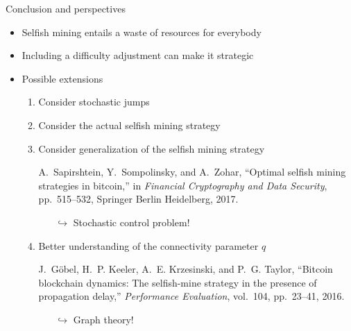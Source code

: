 \documentclass{beamer}
\begin{document}
\begin{frame}{Conclusion and perspectives}
\begin{itemize}
  \item Selfish mining entails a waste of resources for everybody
  \item Including a difficulty adjustment can make it strategic
  \item Possible extensions
  \begin{enumerate}
  \item Consider stochastic jumps
  \item Consider the actual selfish mining strategy
  \item Consider generalization of the selfish mining strategy
  \tiny 
  \begin{thebibliography}{1}

A.~Sapirshtein, Y.~Sompolinsky, and A.~Zohar, ``Optimal selfish mining
  strategies in bitcoin,'' in {\em Financial Cryptography and Data Security},
  pp.~515--532, Springer Berlin Heidelberg, 2017.

\end{thebibliography}
\begin{itemize}
  \item[$\hookrightarrow$] Stochastic control problem!
\end{itemize}
\item \small Better understanding of the connectivity parameter $q$
\tiny 
\begin{thebibliography}{1}

J.~G{\"o}bel, H.~P. Keeler, A.~E. Krzesinski, and P.~G. Taylor, ``Bitcoin
  blockchain dynamics: The selfish-mine strategy in the presence of propagation
  delay,'' {\em Performance Evaluation}, vol.~104, pp.~23--41, 2016.

\end{thebibliography}
\begin{itemize}
  \item[$\hookrightarrow$] Graph theory!
\end{itemize}
\end{enumerate}
\end{itemize}
\end{frame}
% 
% 
\end{document}
